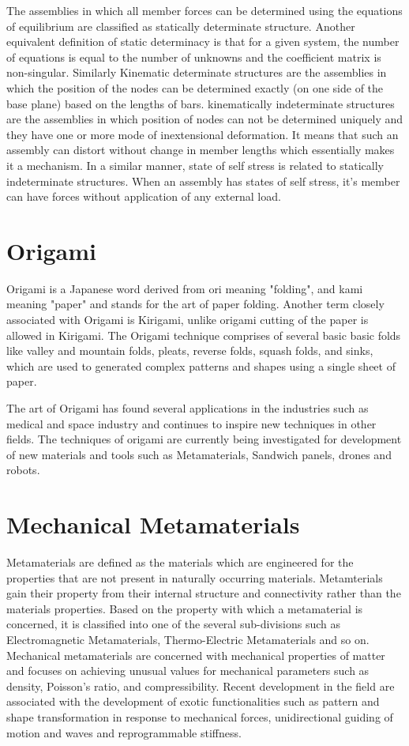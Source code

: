 The assemblies in which all member forces can be determined using the equations of equilibrium are classified as statically determinate structure. Another equivalent definition of static determinacy is that for a given system, the number of equations is equal to the number of unknowns and the coefficient matrix is non-singular. Similarly Kinematic determinate structures are the assemblies in which the position of the nodes can be determined exactly (on one side of the base plane) based on the lengths of bars. kinematically indeterminate structures are the assemblies in which position of nodes can not be determined uniquely and they have one or more mode of inextensional deformation. It means that such an assembly can distort without change in member lengths which essentially makes it a mechanism. In a similar manner, state of self stress is related to statically indeterminate structures. When an assembly has states of self stress, it's member can have forces without application of any external load. 


\section{Origami}
Origami is a Japanese word derived from ori meaning "folding", and kami meaning "paper" and stands for the art of paper folding. Another term closely associated with Origami is Kirigami, unlike origami cutting of the paper is allowed in Kirigami. The Origami technique comprises of several basic basic folds like valley and mountain folds, pleats, reverse folds, squash folds, and sinks, which are used to generated complex patterns and shapes using a single sheet of paper.


The art of Origami has found several applications in the industries such as medical and space industry and continues to inspire new techniques in other fields. The techniques of origami are currently being investigated for development of new materials and tools such as Metamaterials, Sandwich panels, drones and robots.

\section{Mechanical Metamaterials}
Metamaterials are defined as the materials which are engineered for the properties that are not present in naturally occurring materials. Metamterials gain their property from their internal structure and connectivity rather than the materials properties. Based on the property with which a metamaterial is concerned, it is classified into one of the several sub-divisions such as Electromagnetic Metamaterials, Thermo-Electric Metamaterials and so on. Mechanical metamaterials are concerned with mechanical properties of matter and focuses on achieving unusual values for mechanical parameters such as density, Poisson's ratio, and compressibility. Recent development in the field are associated with the development of exotic functionalities such as pattern and shape transformation in response to mechanical forces, unidirectional guiding of motion and waves and reprogrammable stiffness\cite{Berto, Surj}.

